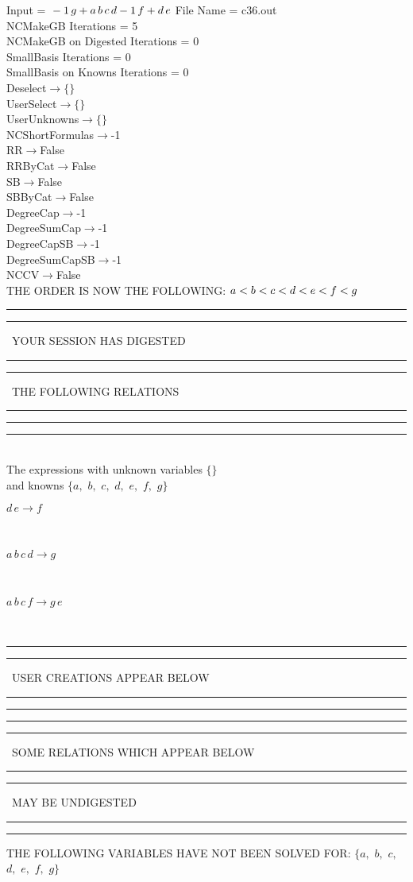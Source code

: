 \documentclass[rep10,leqno]{report}
\begin{document}
\normalsize
\baselineskip=12pt
\noindent
Input = 
$
\\-1\,
 g + a\,
 b\,
 c\,
 d\\
-1\,
 f + d\,
 e\\
$
File Name = c36.out\\
NCMakeGB Iterations = 5\\
NCMakeGB on Digested Iterations = 0\\
SmallBasis Iterations = 0\\
SmallBasis on Knowns Iterations = 0\\
Deselect$\rightarrow \{\}$\\
UserSelect$\rightarrow \{\}$\\
UserUnknowns$\rightarrow \{\}$\\
NCShortFormulas$\rightarrow$-1\\
RR$\rightarrow $False\\
RRByCat$\rightarrow $False\\
SB$\rightarrow $False\\
SBByCat$\rightarrow $False\\
DegreeCap$\rightarrow $-1\\
DegreeSumCap$\rightarrow $-1\\
DegreeCapSB$\rightarrow $-1\\
DegreeSumCapSB$\rightarrow $-1\\
NCCV$\rightarrow $False\\
THE ORDER IS NOW THE FOLLOWING:\hfil\break
$
a<b<c<d<e<f<g\\
$
\rule[2pt]{6in}{4pt}\hfil\break
\rule[2pt]{1.879in}{4pt}
\ YOUR SESSION HAS DIGESTED\ 
\rule[2pt]{1.879in}{4pt}\hfil\break
\rule[2pt]{1.923in}{4pt}
\ THE FOLLOWING RELATIONS\ 
\rule[2pt]{1.923in}{4pt}\hfil\break
\rule[2pt]{6in}{4pt}\hfil\break
\rule[3pt]{6in}{.7pt}\\
The expressions with unknown variables $\{\}$\\
and knowns $\{a,
$ $
b,
$ $
c,
$ $
d,
$ $
e,
$ $
f,
$ $
g\}$\smallskip\\
\begin{minipage}{6in}
$
d\,
 e\rightarrow f
$
\end{minipage}\medskip \\
\begin{minipage}{6in}
$
a\,
 b\,
 c\,
 d\rightarrow g
$
\end{minipage}\medskip \\
\begin{minipage}{6in}
$
a\,
 b\,
 c\,
 f\rightarrow g\,
 e
$
\end{minipage}\\
\rule[2pt]{6in}{1pt}\hfil\break
\rule[2.5pt]{1.701in}{1pt}
\ USER CREATIONS APPEAR BELOW\ 
\rule[2.5pt]{1.701in}{1pt}\hfil\break
\rule[2pt]{6in}{1pt}\hfil\break
\rule[2pt]{6in}{4pt}\hfil\break
\rule[2pt]{1.45in}{4pt}
\ SOME RELATIONS WHICH APPEAR BELOW\ 
\rule[2pt]{1.45in}{4pt}\hfil\break
\rule[2pt]{2.18in}{4pt}
\ MAY BE UNDIGESTED\ 
\rule[2pt]{2.18in}{4pt}\hfil\break
\rule[2pt]{6in}{4pt}\hfil\break
THE FOLLOWING VARIABLES HAVE NOT BEEN SOLVED FOR:\hfil\break
$\{a,
$ $
b,
$ $
c,
$ $
d,
$ $
e,
$ $
f,
$ $
g\}$
\smallskip\\
\vspace{10pt}
\end{document}
